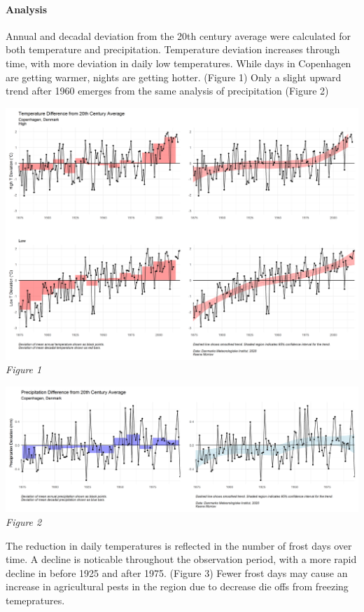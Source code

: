 \documentclass[
]{article}
\let\oldparagraph\paragraph
\renewcommand{\paragraph}[1]{\oldparagraph{#1}\mbox{}}
\begin{document}
\hypertarget{analysis}{%
\paragraph{Analysis}\label{analysis}}

Annual and decadal deviation from the 20th century average were
calculated for both temperature and precipitation. Temperature deviation
increases through time, with more deviation in daily low temperatures.
While days in Copenhagen are getting warmer, nights are getting hotter.
(Figure 1) Only a slight upward trend after 1960 emerges from the same
analysis of precipitation (Figure 2)

\includegraphics{figures/temp_dev_20.png} \emph{Figure 1}

\includegraphics{figures/precip_dev_20.png} \emph{Figure 2}

The reduction in daily temperatures is reflected in the number of frost
days over time. A decline is noticable throughout the observation
period, with a more rapid decline in before 1925 and after 1975. (Figure
3) Fewer frost days may cause an increase in agricultural pests in the
region due to decrease die offs from freezing temepratures.
\end{document}
